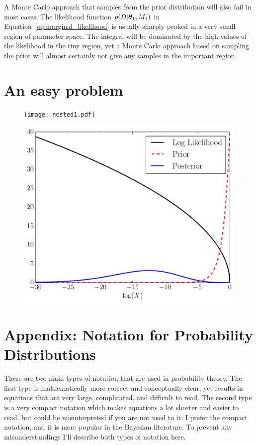 A Monte Carlo approach that samples from the prior distribution will also fail
in most cases. The likelihood function $p(D | \boldsymbol{\theta}_1, M_1)$ in
Equation~\ref{eq:marginal_likelihood} is usually sharply peaked in a very
small region of parameter space. The integral will be dominated by the high values
of the likelihood in the tiny region, yet a Monte Carlo approach based on
sampling the prior will almost certainly not give any samples in the important
region.

\section{An easy problem}


\begin{figure}
\begin{center}
\texttt{[image: nested1.pdf]}
\caption{\label{fig:nested1}}
\end{center}
\end{figure}



\begin{figure}
\begin{center}
\includegraphics[scale=0.5]{nested2.pdf}
\caption{\label{fig:nested2}}
\end{center}
\end{figure}


\section{Appendix: Notation for Probability Distributions}
There are two main types of notation that are used in probability theory. The
first type is mathematically more correct and conceptually
clear, yet results in equations that are very large, complicated,
and difficult to read.
The second type is a very compact notation which makes equations a lot
shorter and easier to read, but could be misinterpreted if you are not used to
it. I prefer the compact notation, and it is more popular in the Bayesian
literature. To prevent any misunderstandings I'll describe both types of
notation here.

